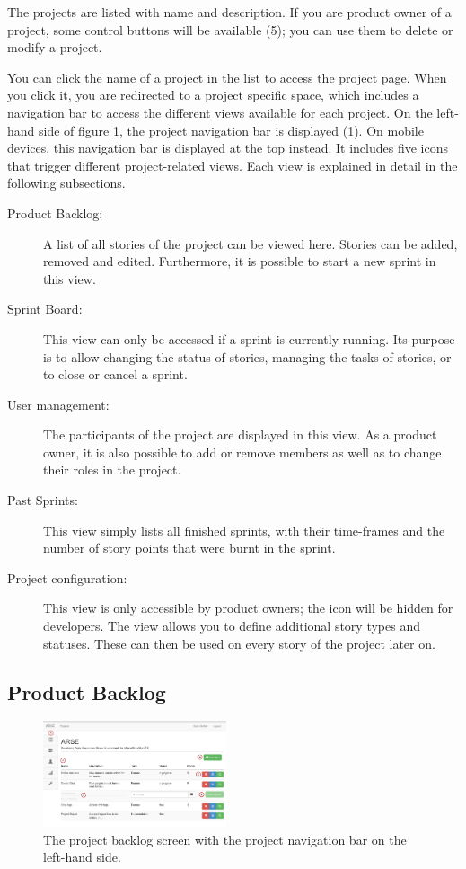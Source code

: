 \documentclass[
	accentcolor=tud1a %
]{tudreport}
\begin{document}
The projects are listed with name and description. If you are product owner of a project, some control buttons will be available (5); you can use them to delete or modify a project.

You can click the name of a project in the list to access the project page. When you click it, you are redirected to a project specific space, which includes a navigation bar to access the different views available for each project. On the left-hand side of figure \ref{fig:project-backlog}, the project navigation bar is displayed (1). On mobile devices, this navigation bar is displayed at the top instead. It includes five icons that trigger different project-related views. Each view is explained in detail in the following subsections.
\begin{description}
	\item[Product Backlog:] A list of all stories of the project can be viewed here. Stories can be added, removed and edited. Furthermore, it is possible to start a new sprint in this view.
	\item[Sprint Board:] This view can only be accessed if a sprint is currently running. Its purpose is to allow changing the status of stories, managing the tasks of stories, or to close or cancel a sprint.
	\item[User management:] The participants of the project are displayed in this view. As a product owner, it is also possible to add or remove members as well as to change their roles in the project.
	\item[Past Sprints:] This view simply lists all finished sprints, with their time-frames and the number of story points that were burnt in the sprint.
	\item[Project configuration:] This view is only accessible by product owners; the icon will be hidden for developers. The view allows you to define additional story types and statuses. These can then be used on every story of the project later on.
\end{description}


\subsection{Product Backlog}
\label{sec:backlog}


\begin{figure}
	\centering
	\includegraphics[width=0.48\textwidth]{img/backlog}
	\caption{The project backlog screen with the project navigation bar on the left-hand side.}
	\label{fig:project-backlog}
\end{figure}
\end{document}
